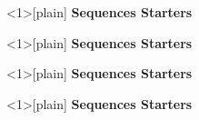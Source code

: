\documentclass{beamer}
\begin{document}
\begin{frame}<1>[plain]
  \centering
  {\LARGE\bfseries Sequences Starters}\\[0.5em]
\end{frame}
\begin{frame}<1>[plain]
  \centering
  {\LARGE\bfseries Sequences Starters}\\[0.5em]
\end{frame}
\begin{frame}<1>[plain]
  \centering
  {\LARGE\bfseries Sequences Starters}\\[0.5em]
\end{frame}
\begin{frame}<1>[plain]
  \centering
  {\LARGE\bfseries Sequences Starters}\\[0.5em]
\end{frame}
\end{document}
